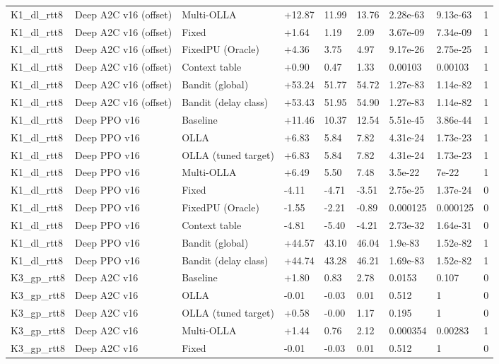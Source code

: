 \documentclass[10pt]{article}
\begin{document}
\begin{landscape}
\begin{longtable}{@{}lllllllll@{}}
K1\_dl\_rtt8 & Deep A2C v16 (offset) & Multi-OLLA & +12.87 & 11.99 & 13.76 & 2.28e-63 & 9.13e-63 & 1 \\
K1\_dl\_rtt8 & Deep A2C v16 (offset) & Fixed & +1.64 & 1.19 & 2.09 & 3.67e-09 & 7.34e-09 & 1 \\
K1\_dl\_rtt8 & Deep A2C v16 (offset) & FixedPU (Oracle) & +4.36 & 3.75 & 4.97 & 9.17e-26 & 2.75e-25 & 1 \\
K1\_dl\_rtt8 & Deep A2C v16 (offset) & Context table & +0.90 & 0.47 & 1.33 & 0.00103 & 0.00103 & 1 \\
K1\_dl\_rtt8 & Deep A2C v16 (offset) & Bandit (global) & +53.24 & 51.77 & 54.72 & 1.27e-83 & 1.14e-82 & 1 \\
K1\_dl\_rtt8 & Deep A2C v16 (offset) & Bandit (delay class) & +53.43 & 51.95 & 54.90 & 1.27e-83 & 1.14e-82 & 1 \\
K1\_dl\_rtt8 & Deep PPO v16 & Baseline & +11.46 & 10.37 & 12.54 & 5.51e-45 & 3.86e-44 & 1 \\
K1\_dl\_rtt8 & Deep PPO v16 & OLLA & +6.83 & 5.84 & 7.82 & 4.31e-24 & 1.73e-23 & 1 \\
K1\_dl\_rtt8 & Deep PPO v16 & OLLA (tuned target) & +6.83 & 5.84 & 7.82 & 4.31e-24 & 1.73e-23 & 1 \\
K1\_dl\_rtt8 & Deep PPO v16 & Multi-OLLA & +6.49 & 5.50 & 7.48 & 3.5e-22 & 7e-22 & 1 \\
K1\_dl\_rtt8 & Deep PPO v16 & Fixed & -4.11 & -4.71 & -3.51 & 2.75e-25 & 1.37e-24 & 0 \\
K1\_dl\_rtt8 & Deep PPO v16 & FixedPU (Oracle) & -1.55 & -2.21 & -0.89 & 0.000125 & 0.000125 & 0 \\
K1\_dl\_rtt8 & Deep PPO v16 & Context table & -4.81 & -5.40 & -4.21 & 2.73e-32 & 1.64e-31 & 0 \\
K1\_dl\_rtt8 & Deep PPO v16 & Bandit (global) & +44.57 & 43.10 & 46.04 & 1.9e-83 & 1.52e-82 & 1 \\
K1\_dl\_rtt8 & Deep PPO v16 & Bandit (delay class) & +44.74 & 43.28 & 46.21 & 1.69e-83 & 1.52e-82 & 1 \\
K3\_gp\_rtt8 & Deep A2C v16 & Baseline & +1.80 & 0.83 & 2.78 & 0.0153 & 0.107 & 0 \\
K3\_gp\_rtt8 & Deep A2C v16 & OLLA & -0.01 & -0.03 & 0.01 & 0.512 & 1 & 0 \\
K3\_gp\_rtt8 & Deep A2C v16 & OLLA (tuned target) & +0.58 & -0.00 & 1.17 & 0.195 & 1 & 0 \\
K3\_gp\_rtt8 & Deep A2C v16 & Multi-OLLA & +1.44 & 0.76 & 2.12 & 0.000354 & 0.00283 & 1 \\
K3\_gp\_rtt8 & Deep A2C v16 & Fixed & -0.01 & -0.03 & 0.01 & 0.512 & 1 & 0 \\

\end{longtable}
\end{landscape}
\end{document}
